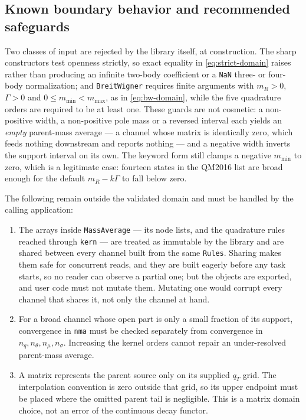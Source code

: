\documentclass[11pt]{article}
\begin{document}
\subsection{Known boundary behavior and recommended safeguards}

Two classes of input are rejected by the library itself, at construction.
The sharp constructors test openness strictly, so exact equality in
\eqref{eq:strict-domain} raises rather than producing an infinite two-body
coefficient or a \texttt{NaN} three- or four-body normalization; and
\texttt{BreitWigner} requires finite arguments with $m_R>0$, $\Gamma>0$ and
$0\le m_{\min}<m_{\max}$, as in \eqref{eq:bw-domain}, while the five quadrature
orders are required to be at least one.  These guards are not cosmetic: a
non-positive width, a non-positive pole mass or a reversed interval each
yields an \emph{empty} parent-mass average --- a channel whose matrix is
identically zero, which feeds nothing downstream and reports nothing --- and a
negative width inverts the support interval on its own.  The keyword form
still clamps a negative $m_{\min}$ to zero, which is a legitimate
case: fourteen states in the QM2016 list are broad enough for the default
$m_R-k\Gamma$ to fall below zero.

The following remain outside the validated domain and must be handled by the
calling application:
\begin{enumerate}
\item The arrays inside \texttt{MassAverage} --- its node lists, and the
quadrature rules reached through \texttt{kern} --- are treated as immutable by
the library and are shared between every channel built from the same
\texttt{Rules}.  Sharing makes them safe for concurrent reads, and they are
built eagerly before any task starts, so no reader can observe a partial one;
but the objects are exported, and user code must not mutate them.  Mutating one
would corrupt every channel that shares it, not only the channel at hand.
\item For a broad channel whose open part is only a small fraction of its
support, convergence in \texttt{nma} must be checked separately from
convergence in $n_q,n_\theta,n_\mu,n_\sigma$.  Increasing the kernel orders
cannot repair an under-resolved parent-mass average.
\item A matrix represents the parent source only on its supplied $q_T$ grid.
The interpolation convention is zero outside that grid, so its upper endpoint
must be placed where the omitted parent tail is negligible.  This is a matrix
domain choice, not an error of the continuous decay functor.
\end{enumerate}
\end{document}
